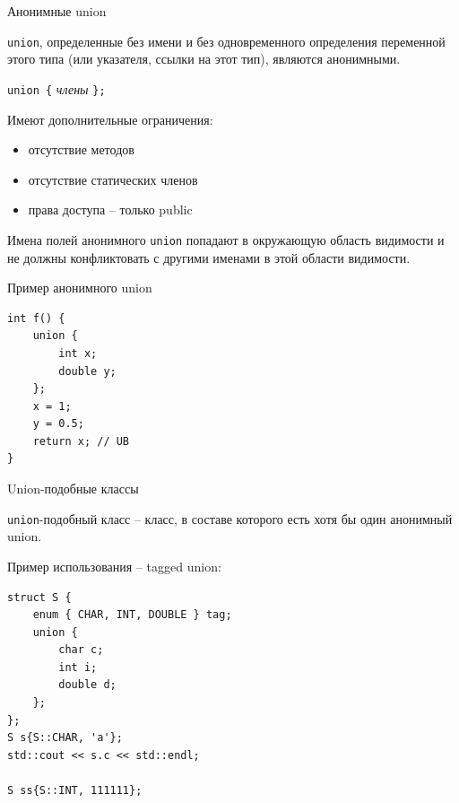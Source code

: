 \documentclass[unknownkeysallowed,xcolor=table]{beamer}
\begin{document}
\begin{frame}[fragile]{Анонимные union}

\lstinline{union}, определенные без имени и без одновременного определения переменной этого типа (или указателя, ссылки на этот тип), являются анонимными.

\vspace{1em}

\lstinline|union {| \emph{члены} \lstinline|};|

\vspace{1em}

Имеют дополнительные ограничения:
\begin{itemize}
  \item отсутствие методов \vspace{0.5em}
  \item отсутствие статических членов \vspace{0.5em}
  \item права доступа -- только public
\end{itemize}

\vspace{1em}

Имена полей анонимного \lstinline{union} попадают в окружающую область видимости и не должны конфликтовать с другими именами в этой области видимости.

\end{frame}

\begin{frame}[fragile]{Пример анонимного union}

\begin{lstlisting}
int f() {
    union {
        int x;
        double y;
    };
    x = 1;
    y = 0.5;
    return x; // UB
}
\end{lstlisting}

\end{frame}

\begin{frame}[fragile]{Union-подобные классы}

\lstinline{union}-подобный класс -- класс, в составе которого есть хотя бы один анонимный union.

\vspace{0.7em}

Пример использования -- tagged union:

\begin{lstlisting}
struct S {
    enum { CHAR, INT, DOUBLE } tag;
    union {
        char c;
        int i;
        double d;
    };
};
S s{S::CHAR, 'a'};
std::cout << s.c << std::endl;

S ss{S::INT, 111111};
\end{lstlisting}

\end{frame}
\end{document}
